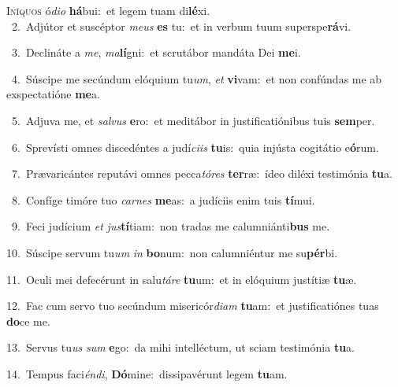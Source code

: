 \lettrine{\initial\textcolor{\initialcolor}{I}}{níquos} ó\-\textit{di}\-\textit{o} \textbf{há}\-bui:~\star et legem tuam di\-\textbf{lé}\-xi.\\
{\numbfont\textcolor{\numbcolor}{~2.}}~Adjútor et suscéptor \textit{me}\-\textit{us} \textbf{es} tu:~\star et in verbum tuum superspe\-\textbf{rá}\-vi.\par
{\numbfont\textcolor{\numbcolor}{~3.}}~Declináte a \textit{me}\-, \textit{ma}\-\textbf{lí}gni:~\star et scrutábor mandáta Dei \textbf{me}\-i.\par
{\numbfont\textcolor{\numbcolor}{~4.}}~Súscipe me secúndum elóquium tu\-\textit{um}\-, \textit{et} \textbf{vi}\-vam:~\star et non confúndas me ab exspectatióne \textbf{me}\-a.\par
{\numbfont\textcolor{\numbcolor}{~5.}}~Adjuva me, et \textit{sal}\-\textit{vus} \textbf{e}\-ro:~\star et meditábor in justificatiónibus tuis \textbf{sem}\-per.\par
{\numbfont\textcolor{\numbcolor}{~6.}}~Sprevísti omnes discedéntes a judí\-\textit{ci}\-\textit{is} \textbf{tu}\-is:~\star quia injústa cogitátio e\-\textbf{ó}\-rum.\par
{\numbfont\textcolor{\numbcolor}{~7.}}~Prævaricántes reputávi omnes pecca\-\textit{tó}\-\textit{res} \textbf{ter}\-ræ:~\star ídeo diléxi testimónia \textbf{tu}\-a.\par
{\numbfont\textcolor{\numbcolor}{~8.}}~Confíge timóre tuo \textit{car}\-\textit{nes} \textbf{me}\-as:~\star a judíciis enim tuis \textbf{tí}\-mui.\par
{\numbfont\textcolor{\numbcolor}{~9.}}~Feci judícium \textit{et} \textit{jus}\-\textbf{tí}tiam:~\star non tradas me calumniánti\textbf{bus} me.\par
{\numbfont\textcolor{\numbcolor}{10.}}~Súscipe servum tu\textit{um} \textit{in} \textbf{bo}\-num:~\star non calumniéntur me su\-\textbf{pér}\-bi.\par
{\numbfont\textcolor{\numbcolor}{11.}}~Oculi mei defecérunt in salu\-\textit{tá}\-\textit{re} \textbf{tu}\-um:~\star et in elóquium justítiæ \textbf{tu}\-æ.\par
{\numbfont\textcolor{\numbcolor}{12.}}~Fac cum servo tuo secúndum misericór\-\textit{di}\-\textit{am} \textbf{tu}\-am:~\star et justificatiónes tuas \textbf{do}\-ce me.\par
{\numbfont\textcolor{\numbcolor}{13.}}~Servus tu\textit{us} \textit{sum} \textbf{e}\-go:~\star da mihi intelléctum, ut sciam testimónia \textbf{tu}\-a.\par
{\numbfont\textcolor{\numbcolor}{14.}}~Tempus faci\-\textit{én}\-\textit{di}, \textbf{Dó}\-mine:~\star dissipavérunt legem \textbf{tu}\-am.\par
